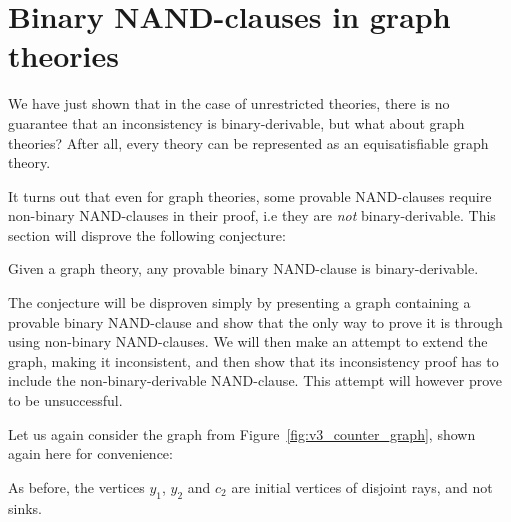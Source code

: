 \section{Binary NAND-clauses in graph theories}
\label{sec:Binary NAND-clauses in graph theories}
We have just shown that in the case of unrestricted theories, there is no guarantee that an inconsistency is binary-derivable, but what about graph theories?
After all, every theory can be represented as an equisatisfiable graph theory.

It turns out that even for graph theories, some provable NAND-clauses require non-binary NAND-clauses in their proof, i.e they are \textit{not} binary-derivable.
This section will disprove the following conjecture:
\begin{conjecture}
  Given a graph theory, any provable binary NAND-clause is binary-derivable.
  \label{thm:non_binary_derivable}
\end{conjecture}
The conjecture will be disproven simply by presenting a graph containing a provable binary NAND-clause and show that the only way to prove it is through using non-binary NAND-clauses.
We will then make an attempt to extend the graph, making it inconsistent, and then show that its inconsistency proof has to include the non-binary-derivable NAND-clause.
This attempt will however prove to be unsuccessful.

Let us again consider the graph from Figure~\ref{fig:v3_counter_graph}, shown again here for convenience:\par
\begin{figure}[!h]
  \centering
  \caption{}
  \label{fig:open_door}
\end{figure}
\FloatBarrier
As before, the vertices $y_1$, $y_2$ and $c_2$ are initial vertices of disjoint rays, and not sinks.

